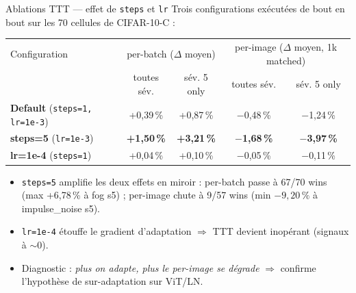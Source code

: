 \documentclass[10pt,aspectratio=169]{beamer}
\newcommand{\good}[1]{\textcolor{green!50!black}{#1}}
\newcommand{\bad}[1]{\textcolor{red!70!black}{#1}}
\newcommand{\code}[1]{\texttt{\small #1}}
\begin{document}
\begin{frame}{Ablations TTT --- effet de \code{steps} et \code{lr}}
  Trois configurations exécutées de bout en bout sur les 70 cellules de CIFAR-10-C :

  \vspace{0.4em}
  \centering
  \small
  \begin{tabular}{lcc|cc}
    \toprule
    Configuration & \multicolumn{2}{c|}{per-batch ($\Delta$ moyen)} & \multicolumn{2}{c}{per-image ($\Delta$ moyen, 1k matched)} \\
                  & toutes sév. & sév. 5 only & toutes sév. & sév. 5 only \\
    \midrule
    \textbf{Default} (\code{steps=1, lr=1e-3}) & \good{+0,39\,\%} & \good{+0,87\,\%} & \bad{$-$0,48\,\%} & \bad{$-$1,24\,\%} \\
    \textbf{steps=5} (\code{lr=1e-3})          & \good{\textbf{+1,50\,\%}} & \good{\textbf{+3,21\,\%}} & \bad{\textbf{$-$1,68\,\%}} & \bad{\textbf{$-$3,97\,\%}} \\
    \textbf{lr=1e-4} (\code{steps=1})          & +0,04\,\%        & +0,10\,\%        & $-$0,05\,\%       & $-$0,11\,\% \\
    \bottomrule
  \end{tabular}

  \vspace{0.6em}
  \begin{itemize}\footnotesize
    \item \alert{\code{steps=5} amplifie les deux effets en miroir} : per-batch passe à 67/70 wins (max +6,78\,\% à fog s5) ; per-image chute à 9/57 wins (min $-9{,}20\,\%$ à impulse\_noise s5).
    \item \code{lr=1e-4} étouffe le gradient d'adaptation $\Rightarrow$ TTT devient inopérant (signaux à $\sim 0$).
    \item Diagnostic : \emph{plus on adapte, plus le per-image se dégrade} $\Rightarrow$ confirme l'hypothèse de sur-adaptation sur ViT/LN.
  \end{itemize}
\end{frame}
\end{document}
